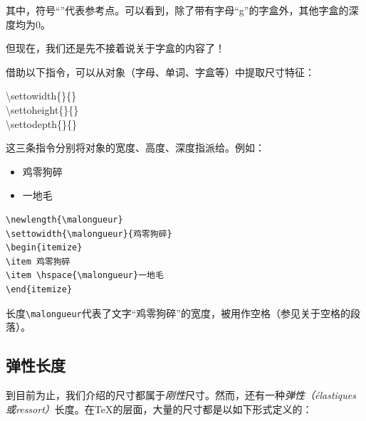 \begin{center}
\end{center}

其中，符号``''代表参考点。可以看到，除了带有字母``g''的字盒外，其他字盒的深度均为0。

但现在，我们还是先不接着说关于字盒的内容了！

借助以下指令，可以从对象（字母、单词、字盒等）中提取尺寸特征：

\begin{dmd}
\backslash settowidth\{\}\{\}\\
\backslash settoheight\{\}\{\}\\
\backslash settodepth\{\}\{\}
\end{dmd}

这三条指令分别将对象的宽度、高度、深度指派给。例如：

\begin{codelist}[4.1]{
\newlength{\malongueur}
\settowidth{\malongueur}{鸡零狗碎}
\begin{itemize}
\item 鸡零狗碎
\item \hspace{\malongueur}一地毛
\end{itemize}
}
\begin{verbatim}
\newlength{\malongueur}
\settowidth{\malongueur}{鸡零狗碎}
\begin{itemize}
\item 鸡零狗碎
\item \hspace{\malongueur}一地毛
\end{itemize}\end{verbatim}
\end{codelist}

长度\verb|\malongueur|代表了文字``鸡零狗碎''的宽度，被用作空格（参见关于空格的段落）。

\subsection{弹性长度}

到目前为止，我们介绍的尺寸都属于\emph{刚性}尺寸。然而，还有一种\emph{弹性（élastiques或ressort）}长度。在\TeX 的层面，大量的尺寸都是以如下形式定义的：

